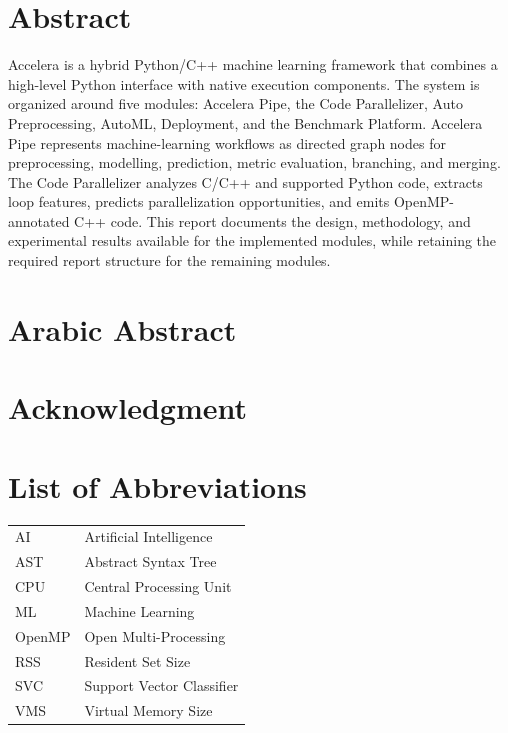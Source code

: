 \documentclass[12pt,a4paper]{report}
\newcommand{\project}{Accelera}
\begin{document}
\setcounter{page}{2}

\chapter*{Abstract}
\project{} is a hybrid Python/C++ machine learning framework that combines a
high-level Python interface with native execution components. The system is
organized around five modules: Accelera Pipe, the Code Parallelizer,
Auto Preprocessing, AutoML, Deployment, and the Benchmark Platform. Accelera
Pipe represents machine-learning workflows as directed graph nodes for
preprocessing, modelling, prediction, metric evaluation, branching, and
merging. The Code Parallelizer analyzes C/C++ and supported Python code,
extracts loop features, predicts parallelization opportunities, and emits
OpenMP-annotated C++ code. This report documents the design, methodology, and
experimental results available for the implemented modules, while retaining
the required report structure for the remaining modules.

\clearpage
\chapter*{Arabic Abstract}

\clearpage
\chapter*{Acknowledgment}

\clearpage
\tableofcontents
\clearpage
\listoffigures
\clearpage
\listoftables
\clearpage

\chapter*{List of Abbreviations}
\begin{tabular}{ll}
AI & Artificial Intelligence \\
AST & Abstract Syntax Tree \\
CPU & Central Processing Unit \\
ML & Machine Learning \\
OpenMP & Open Multi-Processing \\
RSS & Resident Set Size \\
SVC & Support Vector Classifier \\
VMS & Virtual Memory Size \\
\end{tabular}
\end{document}
